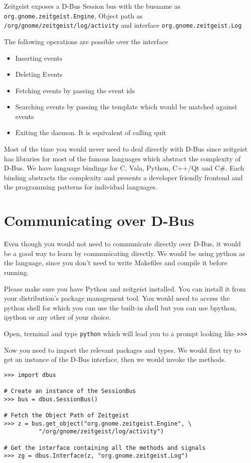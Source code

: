 Zeitgeist exposes a D-Bus Session bus with the busname as \texttt{org.gnome.zeitgeist.Engine}, 
Object path as \texttt{/org/gnome/zeitgeist/log/activity} and interface 
\texttt{org.gnome.zeitgeist.Log}


The following operations are possible over the interface

\begin{itemize}
\item Inserting events
\item Deleting Events
\item Fetching events by passing the event ids
\item Searching events by passing the template which would be matched against events
\item Exiting the daemon. It is equivalent of calling quit
\end{itemize}

Most of the time you would never need to deal directly with D-Bus since zeitgeist has 
libraries for most of the famous languages which abstract the complexity of D-Bus. We 
have language bindings for C, Vala, Python, C++/Qt and C\#. Each binding abstracts the 
complexity and presents a developer friendly frontend and the programming patterns 
for individual languages.

\section{Communicating over D-Bus}

Even though you would not need to communicate directly over D-Bus, it would be a good 
way to learn by communicating directly. We would be using python as the language, since 
you don't need to write Makefiles and compile it before running.

Please make sure you have Python and zeitgeist installed. You can install it from your 
distribution's package management tool. You would need to access the python shell for 
which you can use the built-in shell but you can use bpython, ipython or any other 
of your choice.

Open, terminal and type \texttt{python} which will lead you to a prompt looking like 
\texttt{>>>}

Now you need to import the relevant packages and types. We would first try to get an 
instance of the D-Bus interface, then we would invoke the methods.

\begin{center}
\begin{verbatim}
>>> import dbus

# Create an instance of the SessionBus
>>> bus = dbus.SessionBus()

# Fetch the Object Path of Zeitgeist
>>> z = bus.get_object("org.gnome.zeitgeist.Engine", \
          "/org/gnome/zeitgeist/log/activity")

# Get the interface containing all the methods and signals
>>> zg = dbus.Interface(z, "org.gnome.zeitgeist.Log")
\end{verbatim}
\end{center}

